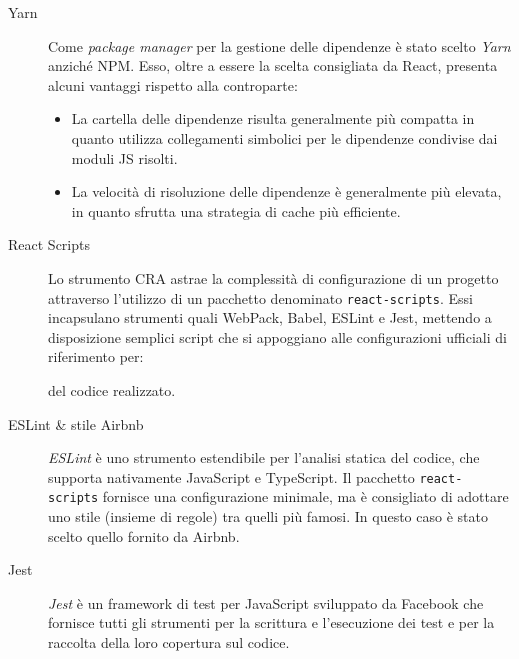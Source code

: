       \begin{description}
        \item[Yarn]
          Come \emph{package manager} per la gestione delle dipendenze è stato scelto \emph{Yarn} anziché NPM\@.
          Esso, oltre a essere la scelta consigliata da React, presenta alcuni vantaggi rispetto alla controparte:
          \begin{itemize}
            \item La cartella delle dipendenze risulta generalmente più compatta in quanto utilizza collegamenti simbolici per le dipendenze condivise dai moduli JS risolti.
            \item La velocità di risoluzione delle dipendenze è generalmente più elevata, in quanto sfrutta una strategia di cache più efficiente.
          \end{itemize}

        \item[React Scripts]
          Lo strumento CRA astrae la complessità di configurazione di un progetto attraverso l'utilizzo di un pacchetto denominato \texttt{react-scripts}.
          Essi incapsulano strumenti quali WebPack, Babel, ESLint e Jest, mettendo a disposizione semplici script che si appoggiano alle configurazioni ufficiali di riferimento per:
          del codice realizzato.

        \item[ESLint \& stile Airbnb]
          \emph{ESLint} è uno strumento estendibile per l'analisi statica del codice, che supporta nativamente JavaScript e TypeScript.
          Il pacchetto \texttt{react-scripts} fornisce una configurazione minimale, ma è consigliato di adottare uno stile (insieme di regole) tra quelli più famosi.
          In questo caso è stato scelto quello fornito da Airbnb.

        \item[Jest]
          \emph{Jest} è un framework di test per JavaScript sviluppato da Facebook che fornisce tutti gli strumenti per la scrittura e l'esecuzione dei test e per la raccolta della loro copertura sul codice.
      \end{description}

